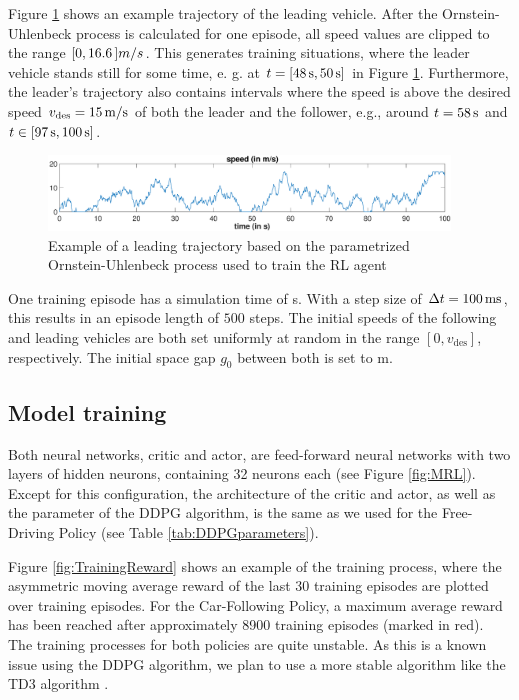 \documentclass[review]{elsarticle}
\providecommand{\sub}[1]{_{\mathrm{#1}}}  %
\providecommand{\3}{{\ss}}
\begin{document}
	
	Figure \ref{fig:AR1process} shows an example trajectory of the leading
	vehicle. After the Ornstein-Uhlenbeck process is calculated for one
	episode, all speed values are clipped to the range $\unit[[0, 16.6]]{m/s}$. This generates
	training situations, where the leader vehicle stands still for some
	time, e. g. at $t= [\unit[48]{s}, \unit[50]{s}]$ in Figure
	\ref{fig:AR1process}. Furthermore, the leader's trajectory
	also contains intervals where the speed is above the desired speed
	$v\sub{des}=\unit[15]{m/s}$ of both the leader and the follower,
	e.g., around $t=\unit[58]{s}$ and $t\in [\unit[97]{s},
	\unit[100]{s}]$.
	\begin{figure}
		\centering
		\includegraphics[width=0.95\textwidth]{images/AR1process}
		\caption{Example of a leading trajectory based on the parametrized Ornstein-Uhlenbeck process used to train the RL agent}
		\label{fig:AR1process}
	\end{figure}
	One training episode has a simulation time of \unit[50]{s}.  With a step size of
	$\Delta t=\unit[100]{ms}$, this results in an episode length of $500$
	steps. The initial speeds of the following and leading vehicles are both
	set uniformly at random in the range $[0,v\sub{des}]$,
	respectively. The initial space gap $g_0$ between both is set to \unit[120]{m}. 
	
	\subsection{Model training}
	Both neural networks, critic and actor, are feed-forward neural networks with two layers of hidden neurons, containing 32 neurons each (see Figure \ref{fig:MRL}). Except for this configuration, the architecture of the critic and actor, as well as the parameter of the DDPG algorithm, is the same as we used for the Free-Driving Policy (see Table \ref{tab:DDPGparameters}).
	
	Figure \ref{fig:TrainingReward} shows an example of the training
	process, where the asymmetric moving average reward of the last 30
	training episodes are plotted over training episodes. For the
	Car-Following Policy, a maximum average reward has been reached after
	approximately 8900 training episodes (marked in red). The training processes for both policies are quite unstable. As this is a known issue using the DDPG algorithm, we plan to use a more stable algorithm like the TD3 algorithm \citep{TD3}.    
	
\end{document}
